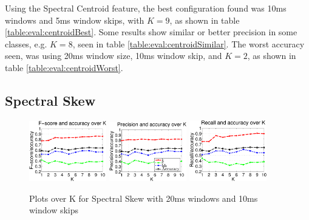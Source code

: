 		Using the Spectral Centroid feature, the best configuration found was 10ms windows and 5ms window skips, with $K=9$, as shown in table \ref{table:eval:centroidBest}. Some results show similar or better precision in some classes, e.g. $K=8$, seen in table \ref{table:eval:centroidSimilar}. The worst accuracy seen, was using 20ms window size, 10ms window skip, and $K=2$, as shown in table \ref{table:eval:centroidWorst}.
		
				
	\subsection{Spectral Skew}
			
		\begin{figure}
			\centering\includegraphics[width=0.3\textwidth]{tex/appendices/test/sskew2010FP.png}
			\centering\includegraphics[width=0.3\textwidth]{tex/appendices/test/sskew2010_P.png}
			\centering\includegraphics[width=0.3\textwidth]{tex/appendices/test/sskew2010_R.png}
			
			\caption{Plots over K for Spectral Skew with 20ms windows and 10ms window skips}
		\end{figure}
		
